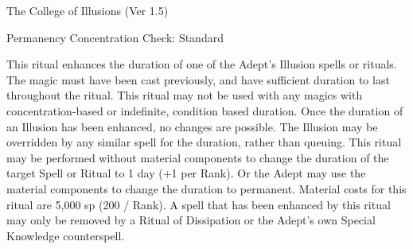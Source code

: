 \begin{Chapter}{The College of Illusions (Ver 1.5)}
\begin{ritual}[R-3]{Permanency}
Concentration Check: Standard 
\begin{effects}
This ritual enhances the duration of one of the Adept’s Illusion
spells or rituals.  The magic must have been cast previously, and have
sufficient duration to last throughout the ritual.  This ritual may
not be used with any magics with concentration-based or indefinite,
condition based duration.  Once the duration of an Illusion has been
enhanced, no changes are possible. The Illusion may be overridden by
any similar spell for the duration, rather than queuing.  This ritual
may be performed without material components to change the duration of
the target Spell or Ritual to 1 day (+1 per Rank).  Or the Adept may
use the material components to change the duration to permanent.
Material costs for this ritual are 5,000 sp (200 / Rank).  A spell
that has been enhanced by this ritual may only be removed by a Ritual
of Dissipation or the Adept’s own Special Knowledge counterspell.
\end{effects}
\end{ritual}
\end{Chapter}
